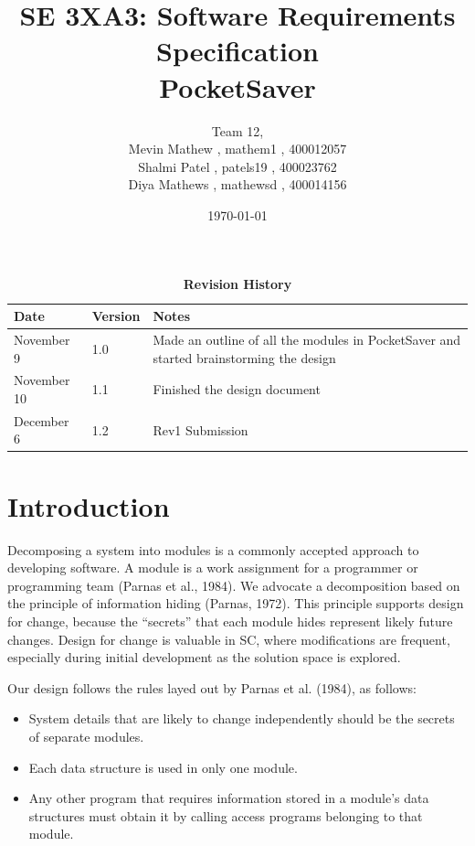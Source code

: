 \documentclass[12pt, titlepage]{article}
\title{SE 3XA3: Software Requirements Specification\\PocketSaver}
\author{Team 12, 
		\\ Mevin Mathew , mathem1 , 400012057
		\\ Shalmi Patel , patels19 , 400023762
		\\ Diya Mathews , mathewsd , 400014156
}
\date{\today}
\begin{document}
\maketitle

\tableofcontents
\listoftables
\listoffigures

\begin{table}[bp]
\caption{\bf Revision History}
\begin{tabularx}{\textwidth}{p{3cm}p{2cm}X}
\toprule {\bf Date} & {\bf Version} & {\bf Notes}\\
\midrule
November 9 & 1.0 & Made an outline of all the modules in PocketSaver and started brainstorming the design\\
November 10 & 1.1 & Finished the design document\\
\midrule
December 6 & 1.2 & Rev1 Submission\\
\bottomrule
\end{tabularx}
\end{table}

\newpage


\section{Introduction}

Decomposing a system into modules is a commonly accepted approach to developing
software.  A module is a work assignment for a programmer or programming
team (Parnas et al., 1984).  We advocate a decomposition
based on the principle of information hiding (Parnas, 1972).  This
principle supports design for change, because the ``secrets'' that each module
hides represent likely future changes.  Design for change is valuable in SC,
where modifications are frequent, especially during initial development as the
solution space is explored.  

Our design follows the rules layed out by Parnas et al. (1984), as follows:
\begin{itemize}
\item System details that are likely to change independently should be the
  secrets of separate modules.
\item Each data structure is used in only one module.
\item Any other program that requires information stored in a module's data
  structures must obtain it by calling access programs belonging to that module.
\end{itemize}
\end{document}
